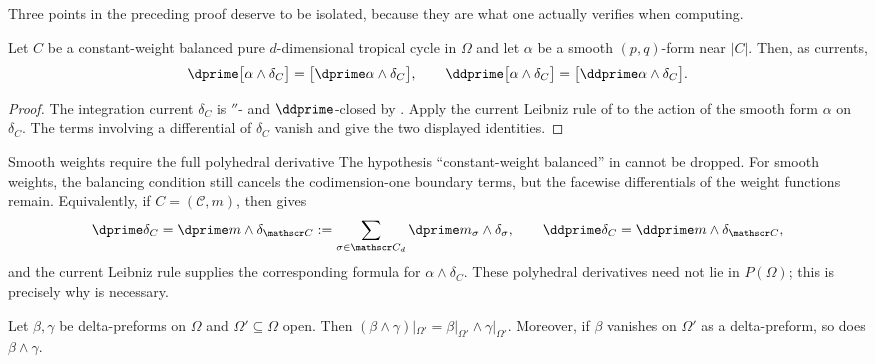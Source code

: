 Three points in the preceding proof deserve to be isolated, because they
are what one actually verifies when computing.

\begin{lemma}
\label{lem:ch18-differential-delta}
Let $C$ be a constant-weight balanced pure $d$-dimensional tropical cycle
in $\Omega$ and let $\alpha$ be a smooth $(p,q)$-form near $|C|$.  Then, as
currents,
\begin{equation}
\label{eq:ch18-leibniz-delta}
 \dprime\bigl[\alpha\wedge\delta_C\bigr]
 =\bigl[\dprime\alpha\wedge\delta_C\bigr],
 \qquad
 \ddprime\bigl[\alpha\wedge\delta_C\bigr]
 =\bigl[\ddprime\alpha\wedge\delta_C\bigr].
\end{equation}
\end{lemma}

\begin{proof}
The integration current $\delta_C$ is $\dprime$- and
$\ddprime$-closed by .  Apply the current
Leibniz rule of  to the action of
the smooth form $\alpha$ on $\delta_C$.  The terms involving a differential
of $\delta_C$ vanish and give the two displayed identities.
\end{proof}

\begin{warning}{Smooth weights require the full polyhedral derivative}
The hypothesis ``constant-weight balanced'' in
 cannot be dropped.  For smooth weights,
the balancing condition still cancels the codimension-one boundary terms,
but the facewise differentials of the weight functions remain.  Equivalently,
if $C=(\mathscr C,m)$, then \cite[Proposition~2.16]{GK17} gives
\[
 \dprime\delta_C=\dprime m\wedge\delta_{\mathscr C}
   :=\sum_{\sigma\in\mathscr C_d}
        \dprime m_\sigma\wedge\delta_\sigma,
 \qquad
 \ddprime\delta_C=\ddprime m\wedge\delta_{\mathscr C},
\]
and the current Leibniz rule supplies the corresponding formula for
$\alpha\wedge\delta_C$.  These polyhedral derivatives need not lie in
$P(\Omega)$; this is precisely why
 is necessary.
\end{warning}

\begin{lemma}
\label{lem:ch18-product-local}
Let $\beta,\gamma$ be delta-preforms on $\Omega$ and $\Omega'\subseteq\Omega$
open.  Then $(\beta\wedge\gamma)|_{\Omega'}=\beta|_{\Omega'}\wedge
\gamma|_{\Omega'}$.  Moreover, if $\beta$ vanishes on $\Omega'$ as a
delta-preform, so does $\beta\wedge\gamma$.
\end{lemma}

